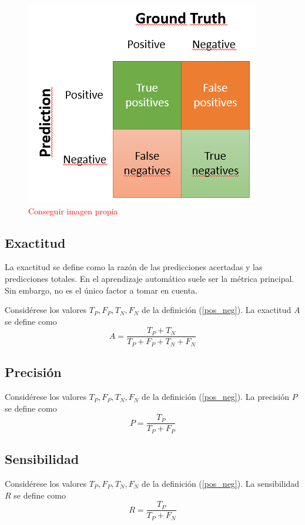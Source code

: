 \begin{figure}[H]
    \centering
    \includegraphics{../cap5_experimentos/src/matriz_confusion_binaria.png}
    \caption{\textcolor{red}{Conseguir imagen propia}}
\end{figure}
\subsection{Exactitud}
La exactitud se define como la razón de las predicciones acertadas y las predicciones totales. En el aprendizaje automático suele ser la métrica principal. Sin embargo, no es el único factor  a tomar en cuenta.
\begin{definition}[exactitud]
    Considérese los valores $T_P, F_P, T_N, F_N$ de la definición (\ref{pos_neg}). La exactitud $A$ se define como 
    \begin{equation}
        A = \frac{T_P + T_N}{T_P + F_P + T_N + F_N}
    \end{equation}
\end{definition}
\subsection{Precisión}
\begin{definition}[Precisión]
    Considérese los valores $T_P, F_P, T_N, F_N$ de la definición (\ref{pos_neg}). La precisión $P$ se define como 
    \begin{equation}
        P = \frac{T_P}{T_P + F_P}
    \end{equation}
\end{definition}
\subsection{Sensibilidad}
\begin{definition}[Sensibilidad]
    Considérese los valores $T_P, F_P, T_N, F_N$ de la definición (\ref{pos_neg}). La sensibilidad $R$ se define como 
    \begin{equation}
        R = \frac{T_P}{T_P + F_N}
    \end{equation}
\end{definition}
